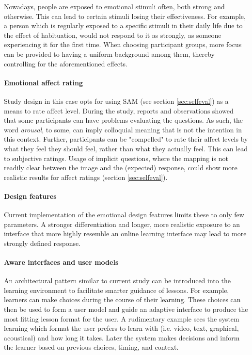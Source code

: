 Nowadays, people are exposed to emotional stimuli often, both strong and otherwise. This can lead to certain stimuli losing their effectiveness. For example, a person which is regularly exposed to a specific stimuli in their daily life due to the effect of habituation, would not respond to it as strongly, as someone experiencing it for the first time. When choosing participant groups, more focus can be provided to having a uniform background among them, thereby controlling for the aforementioned effects.

\paragraph{Emotional affect rating}
Study design in this case opts for using SAM (see section \ref{sec:selfeval}) as a means to rate affect level. During the study, reports and observations showed that some participants can have problems evaluating the questions. As such, the word \textit{arousal}, to some, can imply colloquial meaning that is not the intention in this context. Further, participants can be "compelled" to rate their affect levels by what they feel they should feel, rather than what they actually feel. This can lead to subjective ratings.
Usage of implicit questions, where the mapping is not readily clear between the image and the (expected) response, could show more realistic results for affect ratings (section \ref{sec:selfeval}).

\paragraph{Design features}
Current implementation of the emotional design features limits these to only few parameters. A stronger differentiation and longer, more realistic exposure to an interface that more highly resemble an online learning interface may lead to more strongly defined response.

\paragraph{Aware interfaces and user models}
An architectural pattern similar to current study can be introduced into the learning environment to facilitate smarter guidance of lessons. For example, learners can make choices during the course of their learning. These choices can then be used to form a user model and guide an adaptive interface to produce the most fitting lesson format for the user.
A rudimentary example sees the system learning which format the user prefers to learn with (i.e. video, text, graphical, acoustical) and how long it takes. Later the system makes decisions and inform the learner based on previous choices, timing, and context.


